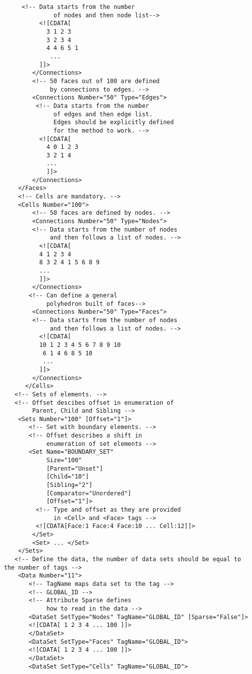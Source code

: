 \documentclass[14pt]{article}
\begin{document}
\begin{lstlisting}
	 <!-- Data starts from the number 
              of nodes and then node list-->
          <![CDATA[
            3 1 2 3
            3 2 3 4
            4 4 6 5 1
             ...
          ]]>
        </Connections>
        <!-- 50 faces out of 100 are defined 
             by connections to edges. -->
        <Connections Number="50" Type="Edges"> 
         <!-- Data starts from the number 
              of edges and then edge list.
              Edges should be explicitly defined 
              for the method to work. -->
          <![CDATA[
            4 0 1 2 3
            3 2 1 4
            ...
            ]]>
        </Connections>
    </Faces>
    <!-- Cells are mandatory. -->
    <Cells Number="100">
        <!-- 50 faces are defined by nodes. -->
        <Connections Number="50" Type="Nodes"> 
        <!-- Data starts from the number of nodes 
             and then follows a list of nodes. -->
          <![CDATA[
          4 1 2 3 4
          8 3 2 4 1 5 6 8 9 
          ...
          ]]> 
        </Connections>
       <!-- Can define a general 
            polyhedron built of faces-->
        <Connections Number="50" Type="Faces"> 
        <!-- Data starts from the number of nodes 
             and then follows a list of nodes. -->
          <![CDATA[
          10 1 2 3 4 5 6 7 8 9 10 
           6 1 4 6 8 5 10 
           ...
          ]]> 
        </Connections>
      </Cells>
   <!-- Sets of elements. -->
   <!-- Offset descibes offset in enumeration of 
        Parent, Child and Sibling -->
    <Sets Number="100" [Offset="1"]>
       <!-- Set with boundary elements. -->
       <!-- Offset describes a shift in 
            enumeration of set elements -->
       <Set Name="BOUNDARY_SET"
            Size="100"
            [Parent="Unset"]
            [Child="10"]
            [Sibling="2"]
            [Comparator="Unordered"]
            [Offset="1"]>
         <!-- Type and offset as they are provided
              in <Cell> and <Face> tags -->
         <![CDATA[Face:1 Face:4 Face:10 ... Cell:12]]>
        </Set>
        <Set> ... </Set>
    </Sets>
   <!-- Define the data, the number of data sets should be equal to the number of tags -->
    <Data Number="11">
       <!-- TagName maps data set to the tag -->
       <!-- GLOBAL_ID -->
       <!-- Attribute Sparse defines 
            how to read in the data -->
       <DataSet SetType="Nodes" TagName="GLOBAL_ID" [Sparse="False"]> 
	   <![CDATA[ 1 2 3 4 ... 100 ]]>
       </DataSet>
       <DataSet SetType="Faces" TagName="GLOBAL_ID">
	   <![CDATA[ 1 2 3 4 ... 100 ]]>
       </DataSet>
       <DataSet SetType="Cells" TagName="GLOBAL_ID">

\end{lstlisting}
\end{document}
